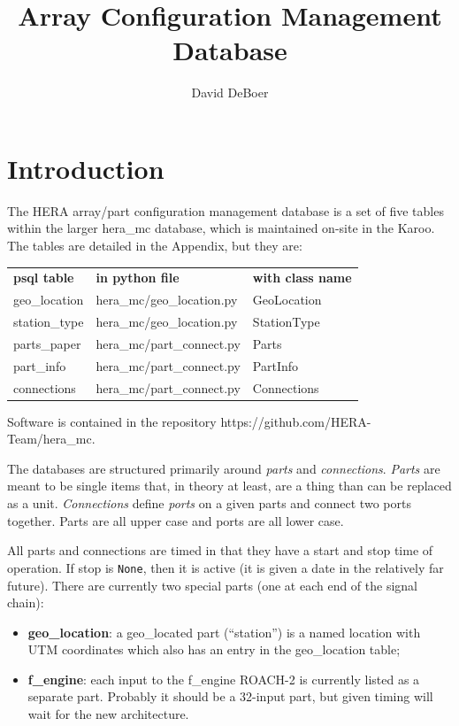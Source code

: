 \documentclass{article}
\begin{document}
\author{David DeBoer}
\title{Array Configuration Management Database}
\maketitle

\section{Introduction}
The HERA array/part configuration management database is a set of five tables within the larger hera\_mc database, which is maintained on-site in the Karoo.  The tables are detailed in the Appendix, 
but they are: 

\begin{center}
\begin{tabular}{l l l}
         {\bf psql table} & {\bf in python file}  &  {\bf with class name} \\
	geo\_location 	& hera\_mc/geo\_location.py & GeoLocation \\
	station\_type 	& hera\_mc/geo\_location.py & StationType \\
	parts\_paper 	& hera\_mc/part\_connect.py & Parts \\
	part\_info 	         & hera\_mc/part\_connect.py & PartInfo \\
	connections 	& hera\_mc/part\_connect.py & Connections \\
\end{tabular}
\end{center}

Software is contained in the repository https://github.com/HERA-Team/hera\_mc.

The databases are structured primarily around {\em parts} and {\em connections}.  {\em Parts} are meant to be single items that, in theory at least, are a thing than can be replaced as a unit.  
{\em Connections} define {\em ports} on a given parts and connect two ports together.  Parts are all upper case and ports are all lower case.

All parts and connections are timed in that they have a start and stop time of operation.  If stop is {\tt None}, then it is active (it is given a date in the relatively far future).  There are currently two special parts (one at each end of the signal chain):
\begin{itemize}
	\item {\bf geo\_location}: a geo\_located part (``station'') is a named location with UTM coordinates which also has an entry in the geo\_location table;
	\item {\bf f\_engine}:  each input to the f\_engine ROACH-2 is currently listed as a separate part.  Probably it should be a 32-input part, but given timing will wait for the new architecture.
\end{itemize}
\end{document}
